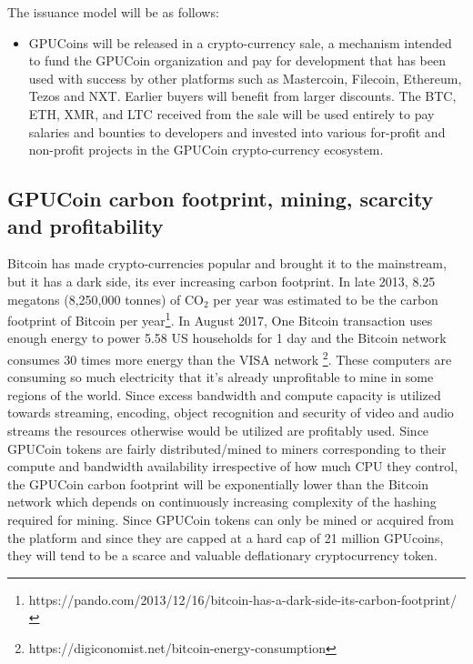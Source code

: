 \documentclass{article}
\begin{document}
The issuance model will be as follows:

\begin{itemize}

\item GPUCoins will be released in a crypto-currency sale,
 a mechanism intended to fund the GPUCoin organization and pay for development that has been used with success by other platforms such as Mastercoin, Filecoin, Ethereum, Tezos and NXT.
Earlier buyers will benefit from larger discounts. The BTC, ETH, XMR, and LTC received from the sale will be used entirely to pay salaries and bounties to developers and invested into various for-profit and non-profit projects in the GPUCoin crypto-currency ecosystem.

\end{itemize}



\subsection{GPUCoin carbon footprint, mining, scarcity and profitability}
Bitcoin has made crypto-currencies popular and brought it to the mainstream, but it has a dark side, its ever increasing carbon footprint. In late 2013, 8.25 megatons (8,250,000 tonnes) of CO$_2$ per year was estimated to be the carbon footprint of Bitcoin per year\footnote{https://pando.com/2013/12/16/bitcoin-has-a-dark-side-its-carbon-footprint/}. In August 2017, One Bitcoin transaction uses enough energy to power 5.58 US households for 1 day and the Bitcoin network consumes 30 times more energy than the VISA network \footnote{https://digiconomist.net/bitcoin-energy-consumption}. These computers are consuming so much electricity that it’s already unprofitable to mine in some regions of the world. Since excess bandwidth and compute capacity is utilized towards streaming, encoding, object recognition and security of video and audio streams the resources otherwise would be utilized are profitably used. Since GPUCoin tokens are fairly distributed/mined to miners corresponding to their compute and bandwidth availability irrespective of how much CPU they control, the GPUCoin carbon footprint will be exponentially lower than the Bitcoin network which depends on continuously increasing complexity of the hashing required for mining. Since GPUCoin tokens can only be mined or acquired from the platform and since they are capped at a hard cap of 21 million GPUcoins, they will tend to be a scarce and valuable deflationary cryptocurrency token.
\end{document}
